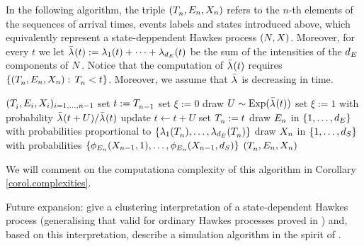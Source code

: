 \documentclass[10pt, article,table]{article}
\begin{document}
In the following algorithm, the triple $(\arrivalTimes[]_n,\event[n],\stateVariable_n)$ refers to the $n$-th elements of the sequences of arrival times, events labels and states introduced above, which equivalently represent a state-deppendent Hawkes process $(\multiCountingProc, \stateVariable)$. Moreover, for every $t$ we let $\bar{\intensity[]}(t):= \intensity[1](t) + \dots + \intensity[\numEventTypes](t)$ be the sum of the intensities of the $\numEventTypes$ components of $\multiCountingProc$. Notice that the computation of $\bar{\intensity[]}(t)$ requires $\lbrace(\arrivalTimes[]_n,\event[n],\stateVariable_n): \, \arrivalTimes[]_n <t\rbrace$. Moreover, we assume that $\bar{\intensity[]}$ is decreasing in time. 
\begin{algorithm}
 \caption{{\citealp[Algorithm 2.4]{MP18sta}}}
 \label{algo.MP18_ogata}
 \begin{algorithmic}[5]
  \REQUIRE $(\arrivalTimes[]_i, \event[i], \stateVariable_i)_{i=1,\dots,n-1}$
  \STATE set $t:=\arrivalTimes[]_{n-1}$
  \STATE set $\xi:=0$
  \STATE draw $U \sim \text{Exp}(\bar{\intensity[]}(t))$
  \STATE set $\xi :=1$ with probability $\bar{\intensity[]}(t+U)/\bar{\intensity[]}(t)$
  \STATE update $t\leftarrow t+U$
  \ENDWHILE
  \STATE set $\arrivalTimes[]_n:=t$
  \STATE draw $\event[n]$ in $\lbrace 1,\dots,\numEventTypes\rbrace$ with probabilities proportional to $\lbrace \intensity[1](\arrivalTimes[]_n), \dots, \intensity[\numEventTypes](\arrivalTimes[]_n)\rbrace$
  \STATE draw $\stateVariable_n$ in $\lbrace 1,\dots,\numStates\rbrace$ with probabilities $\lbrace \transProb_{\event}(\stateVariable_{n-1},1), \dots,\transProb_{\event}(\stateVariable_{n-1},\numStates)\rbrace$
  \RETURN $(\arrivalTimes[]_n,\event[n],\stateVariable_n)$
 \end{algorithmic}
\end{algorithm}

We will comment on the computationa complexity of this algorithm in Corollary \ref{corol.complexities}. 


Future expansion: give a clustering interpretation of a state-dependent Hawkes process (generalising that valid for ordinary Hawkes processes proved in \citealp{HO74clu}) and, based on this interpretation, describe a simulation algorithm in the spirit of \citealp{MR05per}.
\end{document}
